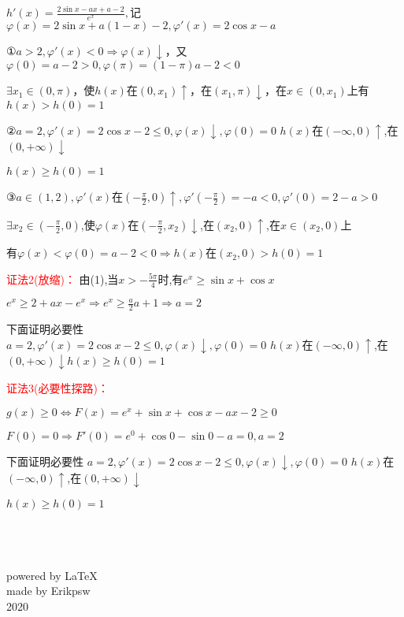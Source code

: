\documentclass[a4paper,12pt]{article}
\begin{document}
\begin{flushleft}
$h'(x) = \frac{{2\sin x - ax + a - 2}}{{{e^x}}},$记$\varphi (x) = 2\sin x + a(1 - x) - 2,\varphi '(x) = 2\cos x - a$

①$a > 2,\varphi '(x) < 0 \Rightarrow \varphi (x) \downarrow $，又$\varphi (0) = a - 2 > 0,\varphi (\pi ) = (1 - \pi )a - 2 < 0$

$\exists {x_1} \in (0,\pi )$，使$h(x)$在$(0,x_1)\uparrow$，在$(x_1,\pi)\downarrow$，在$x\in(0,x_1)$上有$h(x)>h(0)=1$

②$a = 2,\varphi '(x) = 2\cos x - 2 \le 0,\varphi (x) \downarrow ,\varphi (0) = 0$ $h(x)$在$(-\infty,0)\uparrow$,在$(0,+\infty)\downarrow$

$h(x)\ge h(0)=1$

③$a \in (1,2),\varphi '(x)$在$\left( { - \frac{\pi }{2},0} \right) \uparrow ,\varphi '\left( { - \frac{\pi }{2}} \right) =  - a < 0,\varphi '\left( 0 \right) = 2 - a > 0$

$\exists {x_2} \in \left( { - \frac{\pi }{2},0} \right)$,使$\varphi(x)$在$\left( { - \frac{\pi }{2},x_2} \right)\downarrow$,在$(x_2,0)\uparrow$,在$x\in(x_2,0)$上

有$\varphi(x)<\varphi(0)=a-2<0\Rightarrow h(x)$在$(x_2,0)>h(0)=1$

\textcolor{red}{证法2(放缩)：}
由(1),当$x>-\frac{5 \pi}{4} $时,有$e^x \ge \sin x + \cos x $

${e^x} \ge 2 + ax - {e^x} \Rightarrow {e^x} \ge \frac{a}{2}a + 1 \Rightarrow a = 2$

下面证明必要性\\
$a = 2,\varphi '(x) = 2\cos x - 2 \le 0,\varphi (x) \downarrow ,\varphi (0) = 0$ $h(x)$在$(-\infty,0)\uparrow$,在$(0,+\infty)\downarrow h(x)\ge h(0)=1$

\textcolor{red}{证法3(必要性探路)：}

$g(x) \ge 0 \Leftrightarrow F(x) = {e^x} + \sin x + \cos x - ax - 2 \ge 0 $ 

$  F(0) = 0 \Rightarrow F'(0) = {e^0} + \cos 0 - \sin 0 - a = 0,a = 2$

下面证明必要性
$a = 2,\varphi '(x) = 2\cos x - 2 \le 0,\varphi (x) \downarrow ,\varphi (0) = 0$ $h(x)$在$(-\infty,0)\uparrow$,在$(0,+\infty)\downarrow$

$h(x)\ge h(0)=1$
\end{flushleft}
\begin{flushright}
~\\
~\\
~\\
powered by \LaTeX\\
made by Erikpsw\\
2020
\end{flushright}
\end{document}
